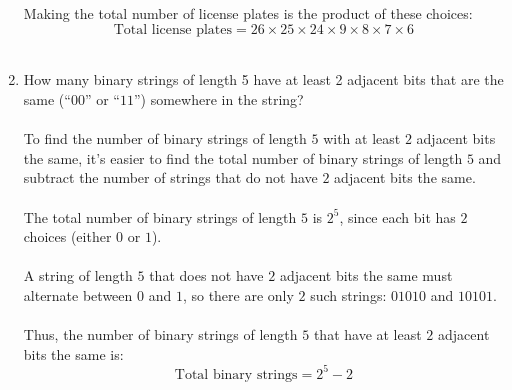\documentclass{amsart}
\theoremstyle{definition}
\theoremstyle{Exercise}
\theoremstyle{remark}
\theoremstyle{rule}
\numberwithin{equation}{section}
\begin{document}
\begin{enumerate}[label=(\alph*)]
\\\\
Making the total number of license plates is the product of these choices:
\[
\text{Total license plates} = 26 \times 25 \times 24 \times 9 \times 8 \times 7 \times 6
\]
\\
    \item How many binary strings of length 5 have at least 2 adjacent bits that are the same (``$00$'' or ``$11$'') somewhere in the string?
\\\\
To find the number of binary strings of length \(5\) with at least \(2\) adjacent bits the same, it's easier to find the total number of binary strings of length \(5\) and subtract the number of strings that do not have \(2\) adjacent bits the same.\\\\
The total number of binary strings of length \(5\) is \(2^5\), since each bit has \(2\) choices (either \(0\) or \(1\)).\\\\
A string of length \(5\) that does not have \(2\) adjacent bits the same must alternate between \(0\) and \(1\), so there are only \(2\) such strings: \(01010\) and \(10101\).\\\\
Thus, the number of binary strings of length \(5\) that have at least \(2\) adjacent bits the same is: 
\[
\text{Total binary strings} = 2^5 - 2
\]
\\
  \end{enumerate}
\newpage
  \section*{}
  \section*{}
\end{document}
